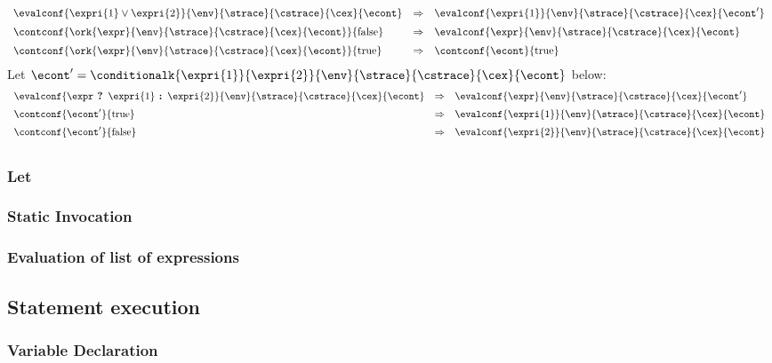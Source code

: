 \documentclass{article}
\begin{document}
\[
  \begin{array}{lcl}
	\evalconf{\expri{1} \lor \expri{2}}{\env}{\strace}{\cstrace}{\cex}{\econt}
	& \Rightarrow &
	\evalconf{\expri{1}}{\env}{\strace}{\cstrace}{\cex}{\econt'}\\[2mm]

	\contconf{\ork{\expr}{\env}{\strace}{\cstrace}{\cex}{\econt}}{\false}
	& \Rightarrow &
	\evalconf{\expr}{\env}{\strace}{\cstrace}{\cex}{\econt}\\[2mm]

	\contconf{\ork{\expr}{\env}{\strace}{\cstrace}{\cex}{\econt}}{\true}
	& \Rightarrow &
	\contconf{\econt}{\true}\\
  \end{array}
\]
\noindent
Let $\econt' = \conditionalk{\expri{1}}{\expri{2}}{\env}{\strace}{\cstrace}{\cex}{\econt}$ below:
\[
  \begin{array}{lcl}
	\evalconf{\expr \textbf{ ? } \expri{1} \textbf{ : } \expri{2}}{\env}{\strace}{\cstrace}{\cex}{\econt}
	& \Rightarrow &
	\evalconf{\expr}{\env}{\strace}{\cstrace}{\cex}{\econt'}\\[2mm]


	\contconf{\econt'}{\true}
	& \Rightarrow &
	\evalconf{\expri{1}}{\env}{\strace}{\cstrace}{\cex}{\econt}\\[2mm]

	\contconf{\econt'}{\false}
	& \Rightarrow &
	\evalconf{\expri{2}}{\env}{\strace}{\cstrace}{\cex}{\econt}\\[2mm]
  \end{array}
\]

\subsubsection{Let}
\subsubsection{Static Invocation}
\subsubsection{Evaluation of list of expressions}
\subsection{Statement execution}
\label{subsec:stmt-exectution}
\subsubsection{Variable Declaration}
\end{document}
